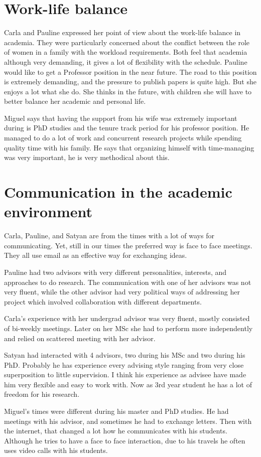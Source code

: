 \documentclass[11pt]{article}
\begin{document}
\section{Work-life balance}
Carla and Pauline expressed her point of view about the work-life balance in academia. They were particularly
concerned about the conflict between the role of women in a family with the workload requirements. Both
feel that academia although very demanding, it gives a lot of flexibility with the schedule.
 Pauline would like to get a Professor position in the near future. The road to this position is extremely
demanding, and the pressure to publish papers is quite high. But she enjoys a lot what she do. She thinks in the
future, with children she will have to better balance her academic and personal life. 

Miguel says that having the support from his wife was extremely important during is PhD studies and the tenure
track period for his professor position. He managed to do a lot of work and concurrent research projects while spending
quality time with his family. He says that organizing himself with time-managing was very important, he is 
very methodical about this. 


\section{Communication in the academic environment}
 Carla, Pauline, and Satyan are from the times with a lot of ways for communicating. Yet, still in our times
the preferred way is face to face meetings. They all use email as an effective way for exchanging 
ideas. 

Pauline had two advisors with very different personalities, interests, and approaches to do 
research. The communication with one of her advisors was not very fluent, while the other advisor had 
very political ways of addressing her project which involved collaboration with different departments. 

Carla's experience with her undergrad advisor was very fluent, mostly consisted of bi-weekly meetings. Later
on her MSc she had to perform more independently and relied on scattered meeting with her advisor. 

Satyan had interacted with 4 advisors,  two during his MSc and two during his PhD. Probably he has 
experience every advising style ranging from very close superposition to little supervision. I think his experience
as advisee have made him very flexible and easy to work with. Now as 3rd year student he has a lot of freedom
for his research. 

Miguel's times were different during his master and PhD studies. He had meetings with his advisor, and sometimes
 he had to exchange letters. Then with the internet, that changed a lot how he communicates with his students. 
 Although he tries to have a face to face interaction, due to his travels he often uses video calls 
with his students. 
\end{document}
